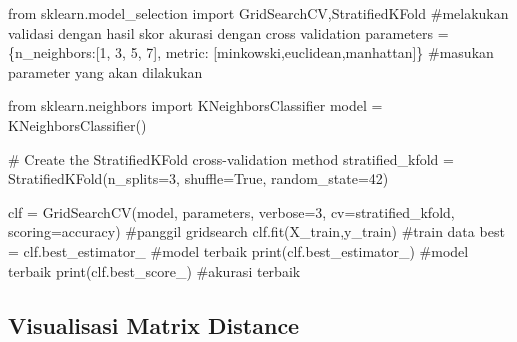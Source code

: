 \documentclass[
  letterpaper,
  DIV=11,
  numbers=noendperiod]{scrreprt}
\newenvironment{Shaded}{\begin{snugshade}}{\end{snugshade}}
\newcommand{\BuiltInTok}[1]{\textcolor[rgb]{0.00,0.23,0.31}{#1}}
\newcommand{\CommentTok}[1]{\textcolor[rgb]{0.37,0.37,0.37}{#1}}
\newcommand{\DecValTok}[1]{\textcolor[rgb]{0.68,0.00,0.00}{#1}}
\newcommand{\ImportTok}[1]{\textcolor[rgb]{0.00,0.46,0.62}{#1}}
\newcommand{\NormalTok}[1]{\textcolor[rgb]{0.00,0.23,0.31}{#1}}
\newcommand{\OperatorTok}[1]{\textcolor[rgb]{0.37,0.37,0.37}{#1}}
\newcommand{\StringTok}[1]{\textcolor[rgb]{0.13,0.47,0.30}{#1}}
\newcommand{\VariableTok}[1]{\textcolor[rgb]{0.07,0.07,0.07}{#1}}
\begin{document}
\begin{Shaded}
\begin{Highlighting}[]
\ImportTok{from}\NormalTok{ sklearn.model\_selection }\ImportTok{import}\NormalTok{ GridSearchCV,StratifiedKFold }\CommentTok{\#melakukan validasi dengan hasil skor akurasi dengan cross validation}
\NormalTok{parameters }\OperatorTok{=}\NormalTok{ \{}\StringTok{\textquotesingle{}n\_neighbors\textquotesingle{}}\NormalTok{:[}\DecValTok{1}\NormalTok{, }\DecValTok{3}\NormalTok{, }\DecValTok{5}\NormalTok{, }\DecValTok{7}\NormalTok{],}
             \StringTok{\textquotesingle{}metric\textquotesingle{}}\NormalTok{: [}\StringTok{\textquotesingle{}minkowski\textquotesingle{}}\NormalTok{,}\StringTok{\textquotesingle{}euclidean\textquotesingle{}}\NormalTok{,}\StringTok{\textquotesingle{}manhattan\textquotesingle{}}\NormalTok{]\} }\CommentTok{\#masukan parameter yang akan dilakukan}

\ImportTok{from}\NormalTok{ sklearn.neighbors }\ImportTok{import}\NormalTok{ KNeighborsClassifier}
\NormalTok{model }\OperatorTok{=}\NormalTok{ KNeighborsClassifier()}

\CommentTok{\# Create the StratifiedKFold cross{-}validation method}
\NormalTok{stratified\_kfold }\OperatorTok{=}\NormalTok{ StratifiedKFold(n\_splits}\OperatorTok{=}\DecValTok{3}\NormalTok{, shuffle}\OperatorTok{=}\VariableTok{True}\NormalTok{, random\_state}\OperatorTok{=}\DecValTok{42}\NormalTok{)}


\NormalTok{clf }\OperatorTok{=}\NormalTok{ GridSearchCV(model, parameters, verbose}\OperatorTok{=}\DecValTok{3}\NormalTok{, cv}\OperatorTok{=}\NormalTok{stratified\_kfold, scoring}\OperatorTok{=}\StringTok{\textquotesingle{}accuracy\textquotesingle{}}\NormalTok{) }\CommentTok{\#panggil gridsearch}
\NormalTok{clf.fit(X\_train,y\_train) }\CommentTok{\#train data}
\NormalTok{best }\OperatorTok{=}\NormalTok{ clf.best\_estimator\_ }\CommentTok{\#model terbaik}
\BuiltInTok{print}\NormalTok{(clf.best\_estimator\_) }\CommentTok{\#model terbaik}
\BuiltInTok{print}\NormalTok{(clf.best\_score\_) }\CommentTok{\#akurasi terbaik}
\end{Highlighting}
\end{Shaded}

\hypertarget{visualisasi-matrix-distance-1}{%
\subsection*{Visualisasi Matrix
Distance}\label{visualisasi-matrix-distance-1}}
\end{document}
